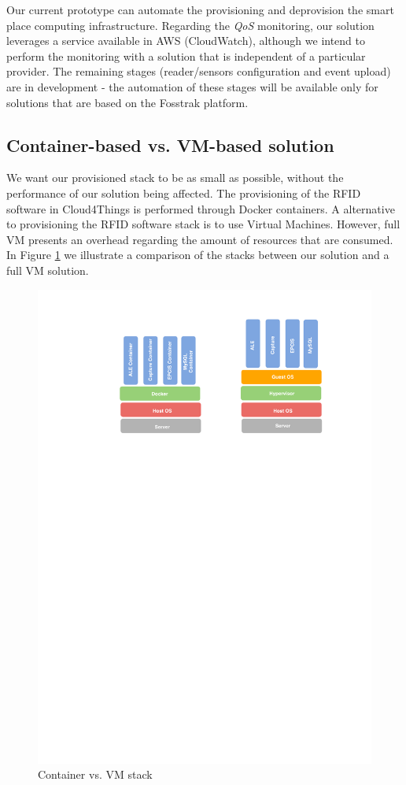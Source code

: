 Our current prototype can automate the provisioning and deprovision the smart place
computing infrastructure. Regarding the \textit{QoS} monitoring, our solution leverages a service
available in AWS (CloudWatch), although we intend to perform the monitoring with a solution that
is independent of a particular provider. The remaining stages (reader/sensors configuration and event
upload) are in development - the automation of these stages will be available only for solutions
that are based on the Fosstrak platform.

\subsection{Container-based vs. VM-based solution}
\label{sub:container_vs_vm_solution}
We want our provisioned stack to be as small as possible, without the performance of our solution being
affected. The provisioning of the RFID software in Cloud4Things is performed through Docker containers.
A alternative to provisioning the RFID software stack is to use Virtual Machines. However, full VM presents
an overhead regarding the amount of resources that are consumed. In Figure \ref{fig:container_vs_vm}
we illustrate a comparison of the stacks between our solution and a full VM solution.

\begin{figure}[!ht]
  \centering
  \includegraphics[width=.75\textwidth]{images/container-vs-vm-stack.pdf}
  \caption{Container vs. VM stack}
  \label{fig:container_vs_vm}
\end{figure}

